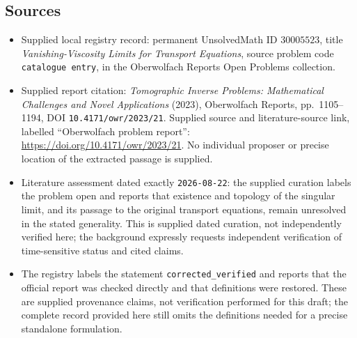 \documentclass[11pt]{article}
\begin{document}
\subsection{Sources}
\begin{itemize}
\item Supplied local registry record: permanent UnsolvedMath ID \(30005523\), title \emph{Vanishing-Viscosity Limits for Transport Equations}, source problem code \texttt{catalogue entry}, in the Oberwolfach Reports Open Problems collection.
\item Supplied report citation: \emph{Tomographic Inverse Problems: Mathematical Challenges and Novel Applications} (2023), Oberwolfach Reports, pp.\ 1105--1194, DOI \texttt{10.4171/owr/2023/21}. Supplied source and literature-source link, labelled ``Oberwolfach problem report'': \url{https://doi.org/10.4171/owr/2023/21}. No individual proposer or precise location of the extracted passage is supplied.
\item Literature assessment dated exactly \texttt{2026-08-22}: the supplied curation labels the problem open and reports that existence and topology of the singular limit, and its passage to the original transport equations, remain unresolved in the stated generality. This is supplied dated curation, not independently verified here; the background expressly requests independent verification of time-sensitive status and cited claims.
\item The registry labels the statement \texttt{corrected\_verified} and reports that the official report was checked directly and that definitions were restored. These are supplied provenance claims, not verification performed for this draft; the complete record provided here still omits the definitions needed for a precise standalone formulation.
\end{itemize}
\end{document}
